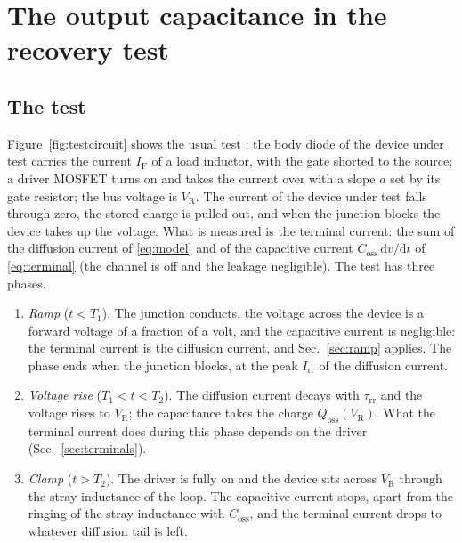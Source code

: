 \documentclass[10pt,a4paper]{scrartcl}
\newcommand{\IF}{I_\mathrm{F}}
\newcommand{\VR}{V_\mathrm{R}}
\newcommand{\Irr}{I_\mathrm{rr}}
\newcommand{\Qoss}{Q_\mathrm{oss}}
\newcommand{\Coss}{C_\mathrm{oss}}
\newcommand{\taurr}{\tau_\mathrm{rr}}
\newcommand{\Tone}{T_1}
\newcommand{\Ttwo}{T_2}
\newcommand{\diff}{\mathrm{d}}
\begin{document}
\section{The output capacitance in the recovery test}
\label{sec:coss}
\subsection{The test}
\label{sec:test}
Figure~\ref{fig:testcircuit} shows the usual test \cite{jedec}: the body diode of the device under test carries the current $\IF$ of a load inductor, with the gate shorted to the source; a driver MOSFET turns on and takes the current over with a slope $a$ set by its gate resistor; the bus voltage is $\VR$. The current of the device under test falls through zero, the stored charge is pulled out, and when the junction blocks the device takes up the voltage. What is measured is the terminal current: the sum of the diffusion current of \eqref{eq:model} and of the capacitive current $\Coss\,\diff v/\diff t$ of \eqref{eq:terminal} (the channel is off and the leakage negligible). The test has three phases.
\begin{enumerate}
\item \emph{Ramp} ($t < \Tone$). The junction conducts, the voltage across the device is a forward voltage of a fraction of a volt, and the capacitive current is negligible: the terminal current is the diffusion current, and Sec.~\ref{sec:ramp} applies. The phase ends when the junction blocks, at the peak $\Irr$ of the diffusion current.
\item \emph{Voltage rise} ($\Tone < t < \Ttwo$). The diffusion current decays with $\taurr$ and the voltage rises to $\VR$; the capacitance takes the charge $\Qoss(\VR)$. What the terminal current does during this phase depends on the driver (Sec.~\ref{sec:terminals}).
\item \emph{Clamp} ($t > \Ttwo$). The driver is fully on and the device sits across $\VR$ through the stray inductance of the loop. The capacitive current stops, apart from the ringing of the stray inductance with $\Coss$, and the terminal current drops to whatever diffusion tail is left.
\end{enumerate}
\end{document}

